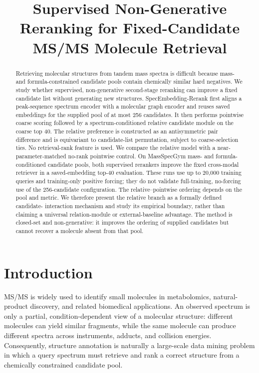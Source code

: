 \documentclass[runningheads]{llncs}
\title{Supervised Non-Generative Reranking for Fixed-Candidate MS/MS Molecule Retrieval}
\author{}
\institute{}
\newcommand{\method}{SpecEmbedding-Rerank}
\begin{document}
\raggedbottom
\setlength{\emergencystretch}{3em}

\maketitle

\begin{abstract}
\begin{sloppypar}
Retrieving molecular structures from tandem mass spectra is difficult because
mass- and formula-constrained candidate pools contain chemically similar hard
negatives. We study whether supervised, non-generative second-stage reranking
can improve a fixed candidate list without generating new structures. \method{}
first aligns a peak-sequence spectrum encoder with a molecular graph encoder and
reuses saved embeddings for the supplied pool of at most 256 candidates. It
then performs pointwise coarse scoring followed by a spectrum-conditioned
relative candidate module on the coarse top 40. The relative preference is
constructed as an antisymmetric pair difference and is equivariant to
candidate-list permutation, subject to coarse-selection ties. No retrieval-rank
feature is used. We compare the relative model with a near-
parameter-matched no-rank pointwise control. On MassSpecGym mass- and
formula-conditioned candidate pools, both supervised rerankers improve the
fixed cross-modal retriever in a saved-embedding top-40 evaluation. These runs
use up to 20,000 training queries and training-only positive forcing; they do
not validate full-training, no-forcing use of the 256-candidate configuration.
The relative--pointwise ordering depends on the pool and metric. We
therefore present the relative branch as a formally defined candidate-
interaction mechanism and study its empirical boundary, rather than claiming
a universal relation-module or external-baseline advantage. The method is
closed-set and non-generative: it improves the ordering of supplied candidates
but cannot recover a molecule absent from that pool.
\end{sloppypar}
\end{abstract}

\section{Introduction}

MS/MS is widely used to identify small molecules in metabolomics,
natural-product discovery, and related biomedical applications.
An observed spectrum is only a partial, condition-dependent view of a molecular
structure: different molecules can yield similar fragments, while the same
molecule can produce different spectra across instruments, adducts, and
collision energies. Consequently, structure annotation is naturally a
large-scale data mining problem in which a query spectrum must retrieve and rank
a correct structure from a chemically constrained candidate pool.
\end{document}
